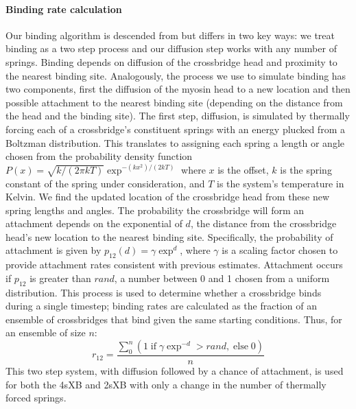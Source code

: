 \documentclass[]{article}
\begin{document}
\paragraph{Binding rate calculation} %
Our binding algorithm is descended from \citet{Tanner2007} but differs in two key ways: we treat binding as a two step process and our diffusion step works with any number of springs.
Binding depends on diffusion of the crossbridge head and proximity to the nearest binding site.
Analogously, the process we use to simulate binding has two components, first the diffusion of the myosin head to a new location and then possible attachment to the nearest binding site (depending on the distance from the head and the binding site).
The first step, diffusion, is simulated by thermally forcing each of a crossbridge's constituent springs with an energy plucked from a Boltzman distribution.
This translates to assigning each spring a length or angle chosen from the probability density function $P(x) = \sqrt{k / (2 \pi kT)} \exp^{-(k x^2)/(2 kT)}$ where $x$ is the offset, $k$ is the spring constant of the spring under consideration, and $T$ is the system's temperature in Kelvin.
We find the updated location of the crossbridge head from these new spring lengths and angles.
The probability the crossbridge will form an attachment depends on the exponential of $d$, the distance from the crossbridge head's new location to the nearest binding site.
Specifically, the probability of attachment is given by $p_{12}(d) = \gamma \exp ^{d}$, where $\gamma$ is a scaling factor chosen to provide attachment rates consistent with previous estimates.
Attachment occurs if $p_{12}$ is greater than $rand$, a number between 0 and 1 chosen from a uniform distribution.
This process is used to determine whether a crossbridge binds during a single timestep; binding rates are calculated as the fraction of an ensemble of crossbridges that bind given the same starting conditions. 
Thus, for an ensemble of size $n$: 
$$r_{12} =  \frac{\sum_0^n \left( 1\; \textrm{if}\; \gamma \exp^{-d}>rand ,\; \textrm{else}\; 0 \right)}{n}$$
This two step system, with diffusion followed by a chance of attachment, is used for both the 4sXB and 2sXB with only a change in the number of thermally forced springs.
\end{document}
